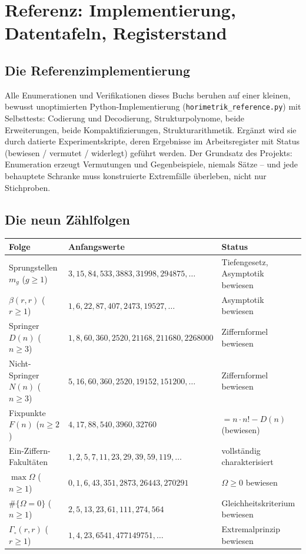 \chapter{Referenz: Implementierung, Datentafeln, Registerstand}
\label{ch:anhang-referenz}

\section*{Die Referenzimplementierung}

Alle Enumerationen und Verifikationen dieses Buchs beruhen auf
einer kleinen, bewusst unoptimierten Python-Implementierung
(\texttt{horimetrik\_reference.py}) mit Selbsttests: Codierung und
Decodierung, Struktur\-polynome, beide Erweiterungen, beide
Kompaktifizierungen, Strukturarithmetik. Ergänzt wird sie durch
datierte Experimentskripte, deren Ergebnisse im Arbeitsregister mit
Status (bewiesen / vermutet / widerlegt) geführt werden. Der
Grundsatz des Projekts: Enumeration erzeugt Vermutungen und
Gegenbeispiele, niemals Sätze -- und jede behauptete Schranke muss
konstruierte Extremfälle überleben, nicht nur Stichproben.

\section*{Die neun Zählfolgen}

\begin{center}
\footnotesize
\begin{tabular}{lll}
\toprule
Folge & Anfangswerte & Status\\
\midrule
Sprungstellen $m_g$ ($g{\ge}1$) & $3,15,84,533,3883,31998,294875,\ldots$ &
Tiefengesetz, Asymptotik bewiesen\\
$\beta(r,r)$ ($r{\ge}1$) & $1,6,22,87,407,2473,19527,\ldots$ & Asymptotik bewiesen\\
Springer $D(n)$ ($n{\ge}3$) & $1,8,60,360,2520,21168,211680,2268000$ &
Ziffernformel bewiesen\\
Nicht-Springer $N(n)$ ($n{\ge}3$) & $5,16,60,360,2520,19152,151200,\ldots$ &
Ziffernformel bewiesen\\
Fixpunkte $F(n)$ ($n{\ge}2$) & $4,17,88,540,3960,32760$ & $=n\cdot n!-D(n)$ (bewiesen)\\
Ein-Ziffern-Fakultäten & $1,2,5,7,11,23,29,39,59,119,\ldots$ &
vollständig charakterisiert\\
$\max\Omega$ ($n{\ge}1$) & $0,1,6,43,351,2873,26443,270291$ & $\Omega\ge0$
bewiesen\\
$\#\{\Omega=0\}$ ($n{\ge}1$) & $2,5,13,23,61,111,274,564$ &
Gleichheitskriterium bewiesen\\
$\Gamma_\circ(r,r)$ ($r{\ge}1$) & $1,4,23,6541,477149751,\ldots$ &
Extremalprinzip bewiesen\\
\bottomrule
\end{tabular}
\end{center}

